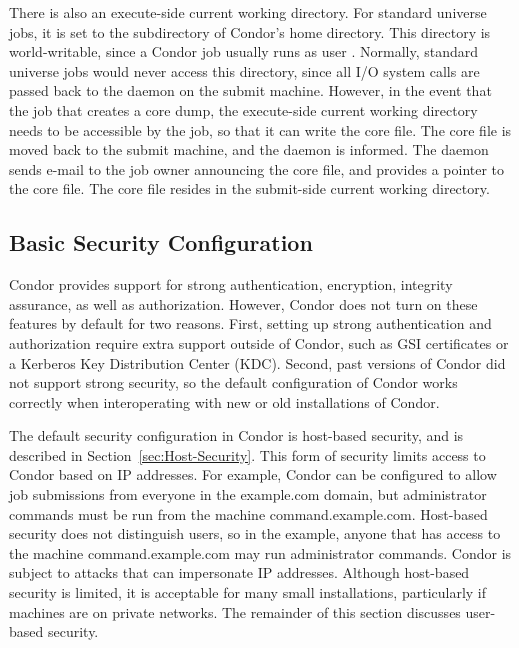 There is also an execute-side current working directory.
For standard universe jobs,
it is set to the
 subdirectory of Condor's home directory.
This directory is world-writable, since a Condor job usually runs as user
.
Normally, standard universe jobs would never access this directory,
since all I/O system calls are passed back to the
 daemon on the submit machine.
However, in the event
that the job that creates a core dump, the execute-side
current working directory needs to be accessible by the job,
so that it can write the core file.
The core file is moved back to the submit machine,
and the  daemon is informed.
The  daemon
sends e-mail to the job owner announcing the core file, and provides a
pointer to the core file.
The core file resides in the submit-side current working directory.


\subsection{\label{sec:Config-Security}Basic Security Configuration}

Condor provides support for strong authentication, encryption,
integrity assurance, as well as authorization.
However, Condor does not turn on these
features by default for two reasons.
First, setting up strong
authentication and authorization require extra support outside of
Condor, such as GSI certificates or a Kerberos Key Distribution Center
(KDC). Second, past versions of Condor did not support strong security,
so the default configuration of Condor works correctly when
interoperating with new or old installations of Condor.

The default security configuration in Condor is host-based security,
and is described in Section~\ref{sec:Host-Security}. 
This form of security limits access to Condor based on IP addresses.
For example,
Condor can be configured to allow job submissions from everyone in the
example.com domain,
but administrator commands must be run from
the machine command.example.com.
Host-based security does not distinguish users,
so in the example, anyone that has access to the machine
command.example.com may run administrator commands.
Condor is subject to attacks that can impersonate IP addresses.
Although host-based security is limited,
it is acceptable for many small installations,
particularly if machines are on private networks.
The remainder of this section discusses user-based security.

